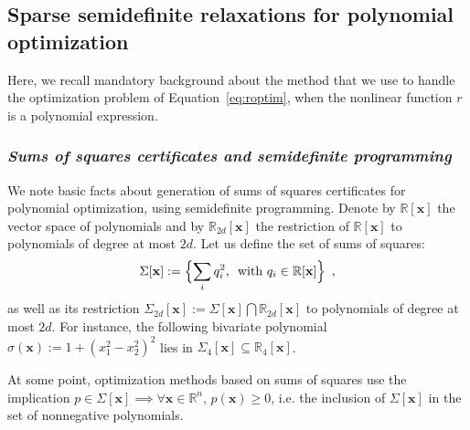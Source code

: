 \documentclass[preprint]{sigplanconf}
\newcommand{\R}{\mathbb{R}}
\newcommand{\x}{\mathbf{x}}
\theoremstyle{plain}
\begin{document}
\subsection{Sparse semidefinite relaxations for polynomial optimization}
\label{sec:sdpbackground}
Here, we recall mandatory background about the method that we use to handle the optimization problem of Equation~\eqref{eq:roptim}, when the nonlinear function $r$ is a polynomial expression.

\subsubsection*{\textit{Sums of squares certificates and semidefinite programming}}
We note basic facts about generation of sums of squares certificates for polynomial optimization, using semidefinite programming.
Denote by $\R[\x]$ the vector space of polynomials and by $\R_{2 d}[\x]$ the restriction of $\R[\x]$ to polynomials of degree at most $2 d$. Let us define the set of sums of squares:
\begin{equation}
\label{eq:cone_sos}
\Sigma[\x] := \Bigl\{\sum_i q_i^2, \, \text{ with } q_i \in \R[\x] \Bigr\}\enspace,
\end{equation}
%
as well as its restriction $\Sigma_{2 d}[\x] := \Sigma[\x] \bigcap \R_{2 d}[\x]$ to polynomials of degree at most $2 d$. For instance, the following bivariate polynomial  $\sigma (\x) := 1 + (x_1^2 - x_2^2)^2$ lies in $\Sigma_4[\x] \subseteq \R_4[\x]$.

At some point, optimization methods based on sums of squares use the implication $p \in \Sigma[\x] \implies \forall \x \in \R^n, \, p(\x) \geq 0$, i.e. the inclusion of $\Sigma[\x]$ in the set of nonnegative polynomials.
\end{document}
